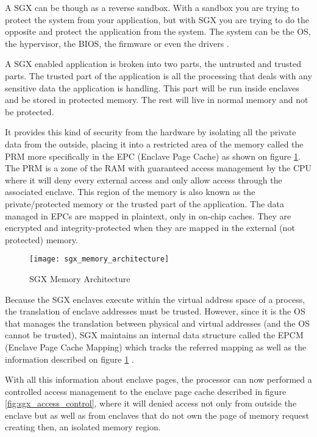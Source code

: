 A \gls{SGX} can be though as a reverse sandbox. With a sandbox you are trying to protect the system from your application, but with \gls{SGX} you are trying to do the opposite and protect the application from the system. The system can be the \gls{OS}, the hypervisor, the BIOS, the firmware or even the drivers \cite{sgx:2}.

A \gls{SGX} enabled application is broken into two parts, the untrusted and trusted parts. The trusted part of the application is all the processing that deals with any sensitive data the application is handling. This part will be run inside enclaves and be stored in protected memory. The rest will live in normal memory and not be protected.

It provides this kind of security from the hardware by isolating all the private data from the outside, placing it into a restricted area of the memory called the \gls{PRM} more specifically in the \gls{EPC} (Enclave Page Cache) as shown on figure \ref{fig:sgx_memory_architecture}. The \gls{PRM} is a zone of the \gls{RAM} with guaranteed access management by the CPU where it will deny every external access and only allow access through the associated enclave. This region of the memory is also known as the private/protected memory or the trusted part of the application. The data managed in \glspl{EPC} are mapped in plaintext, only in on-chip caches. They are encrypted and integrity-protected when they are mapped in the external (not protected) memory.

\begin{figure}[htbp]
	\centering
	{\texttt{[image: sgx\_memory\_architecture]}}%
	\caption{\gls{SGX} Memory Architecture \cite{sgx:4}}
	\label{fig:sgx_memory_architecture}
\end{figure}

Because the \gls{SGX} enclaves execute within the virtual address space of a process, the translation of enclave addresses must be trusted. However, since it is the \gls{OS} that manages the translation between physical and virtual addresses (and the \gls{OS} cannot be trusted), \gls{SGX} maintains an internal data structure called the \gls{EPCM} (Enclave Page Cache Mapping) which tracks the referred mapping as well as the information described on figure \ref{fig:sgx_memory_architecture} \cite{sgx:5}.

With all this information about enclave pages, the processor can now performed a controlled access management to the enclave page cache described in figure \ref{fig:sgx_access_control}, where it will denied access  not only from outside the enclave but as well as from enclaves that do not own the page of memory request creating then, an isolated memory region.

